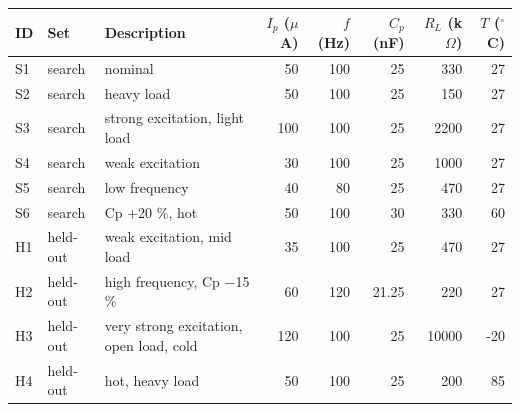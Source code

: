 \begin{tabular}{llp{3.2cm}rrrrr}
\toprule
ID & Set & Description & $I_p$ ($\mu$A) & $f$ (Hz) & $C_p$ (nF) & $R_L$ (k$\Omega$) & $T$ ($^\circ$C) \\
\midrule
S1 & search & nominal & 50 & 100 & 25 & 330 & 27 \\
S2 & search & heavy load & 50 & 100 & 25 & 150 & 27 \\
S3 & search & strong excitation, light load & 100 & 100 & 25 & 2200 & 27 \\
S4 & search & weak excitation & 30 & 100 & 25 & 1000 & 27 \\
S5 & search & low frequency & 40 & 80 & 25 & 470 & 27 \\
S6 & search & Cp +20 \%, hot & 50 & 100 & 30 & 330 & 60 \\
H1 & held-out & weak excitation, mid load & 35 & 100 & 25 & 470 & 27 \\
H2 & held-out & high frequency, Cp $-$15 \% & 60 & 120 & 21.25 & 220 & 27 \\
H3 & held-out & very strong excitation, open load, cold & 120 & 100 & 25 & 10000 & -20 \\
H4 & held-out & hot, heavy load & 50 & 100 & 25 & 200 & 85 \\
\bottomrule
\end{tabular}
